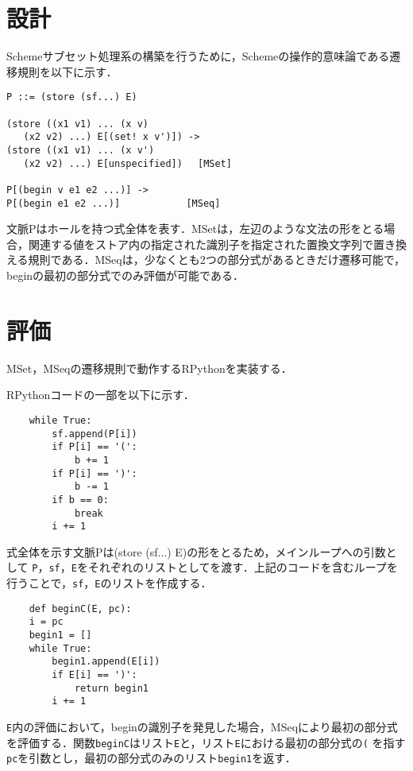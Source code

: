 \documentclass[twocolumn]{jsarticle}
\begin{document}
\section{設計}

Schemeサブセット処理系の構築を行うために，Schemeの操作的意味論である遷移規則\cite{1}を以下に示す．
\begin{verbatim}
P ::= (store (sf...) E)

(store ((x1 v1) ... (x v)
   (x2 v2) ...) E[(set! x v')]) -> 
(store ((x1 v1) ... (x v') 
   (x2 v2) ...) E[unspecified])　 [MSet]

P[(begin v e1 e2 ...)] ->          
P[(begin e1 e2 ...)]　　　　　　　[MSeq]
\end{verbatim}

\noindent
文脈Pはホールを持つ式全体を表す．MSetは，左辺のような文法の形をとる場合，関連する値をストア内の指定された識別子を指定された置換文字列で置き換える規則である．MSeqは，少なくとも2つの部分式があるときだけ遷移可能で，beginの最初の部分式でのみ評価が可能である．

\section{評価}

MSet，MSeqの遷移規則で動作するRPythonを実装する．

\noindent
RPythonコードの一部を以下に示す．

\begin{verbatim}
    while True:
        sf.append(P[i])　
        if P[i] == '(':
            b += 1
        if P[i] == ')':
            b -= 1
        if b == 0:
            break
        i += 1
\end{verbatim}
    
\noindent
式全体を示す文脈Pは(store (sf...) E)の形をとるため，メインループへの引数として
\verb|P|，\verb|sf|，\verb|E|をそれぞれのリストとしてを渡す．上記のコードを含むループを行うことで，\verb|sf|，\verb|E|のリストを作成する．

\begin{verbatim}
    def beginC(E, pc):
    i = pc
    begin1 = []
    while True:
        begin1.append(E[i])
        if E[i] == ')':
            return begin1
        i += 1
\end{verbatim}

\noindent
\verb|E|内の評価において，beginの識別子を発見した場合，MSeqにより最初の部分式を評価する．関数\verb|beginC|はリスト\verb|E|と，リスト\verb|E|における最初の部分式の\verb|(| を指す\verb|pc|を引数とし，最初の部分式のみのリスト\verb|begin1|を返す．
\end{document}
